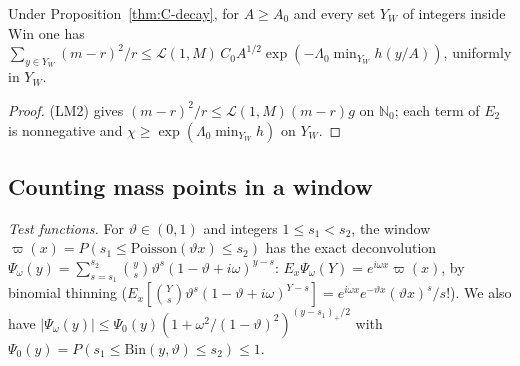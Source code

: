 \begin{corollary}\label{cor:C-window}
Under Proposition~\ref{thm:C-decay}, for $A\ge A_0$ and every set $Y_W$ of integers inside $\mathrm{Win}$ one has $\sum_{y\in Y_W}(m-r)^2/r\le\mathcal L(1,M)\,C_0A^{1/2}\exp(-\Lambda_0\min_{Y_W}h(y/A))$, uniformly in $Y_W$.
\end{corollary}
\begin{proof}
(LM2) gives $(m-r)^2/r\le\mathcal L(1,M)(m-r)g$ on $\mathbb N_0$; each term of $E_2$ is nonnegative and
$\chi\ge\exp(\Lambda_0\min_{Y_W}h)$ on $Y_W$.
\end{proof}

\subsection{Counting mass points in a window}

\emph{Test functions.} For $\vartheta\in(0,1)$ and integers $1\le s_1<s_2$, the window
$\varpi(x)=P(s_1\le\mathrm{Poisson}(\vartheta x)\le s_2)$ has the exact deconvolution
$\Psi_\omega(y)=\sum_{s=s_1}^{s_2}\binom ys\vartheta^s(1-\vartheta+i\omega)^{y-s}$: $E_x\Psi_\omega(Y)=e^{i\omega x}\varpi(x)$, by binomial
thinning ($E_x[\binom Ys\vartheta^s(1-\vartheta+i\omega)^{Y-s}]=e^{i\omega x}e^{-\vartheta x}(\vartheta x)^s/s!$). We also have
$|\Psi_\omega(y)|\le\Psi_0(y)(1+\omega^2/(1-\vartheta)^2)^{(y-s_1)_+/2}$ with $\Psi_0(y)=P(s_1\le\mathrm{Bin}(y,\vartheta)\le s_2)\le1$.

